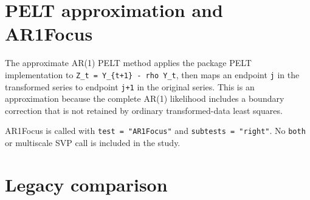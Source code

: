 \documentclass[
  10pt,
]{article}
\begin{document}
\section{PELT approximation and
AR1Focus}\label{pelt-approximation-and-ar1focus}

The approximate AR(1) PELT method applies the package PELT
implementation to \texttt{Z\_t\ =\ Y\_\{t+1\}\ -\ rho\ Y\_t}, then maps
an endpoint \texttt{j} in the transformed series to endpoint
\texttt{j+1} in the original series. This is an approximation because
the complete AR(1) likelihood includes a boundary correction that is not
retained by ordinary transformed-data least squares.

AR1Focus is called with \texttt{test\ =\ "AR1Focus"} and
\texttt{subtests\ =\ "right"}. No \texttt{both} or multiscale SVP call
is included in the study.

\section{Legacy comparison}\label{legacy-comparison}
\end{document}
